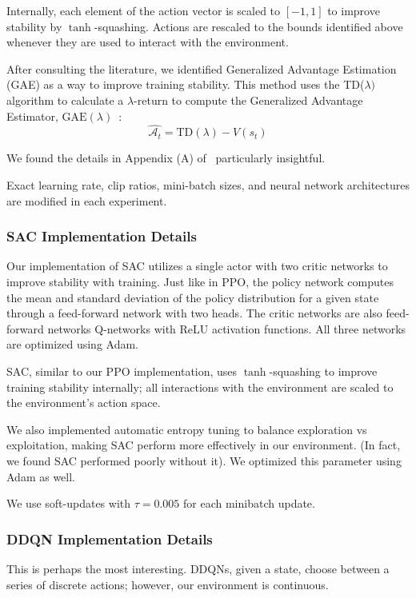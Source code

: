 \documentclass[12pt]{article}
\begin{document}
Internally, each element of the action vector is scaled to $[-1, 1]$ to improve stability by $\tanh$-squashing. Actions are rescaled to the bounds identified above whenever they are used to interact with the environment. 

After consulting the literature, we identified Generalized Advantage Estimation (GAE) as a way to improve training stability. This method uses the TD($\lambda)$ algorithm to calculate a $\lambda$-return to compute the Generalized Advantage Estimator, $\mathrm{GAE}(\lambda)$~\cite{schulman2015high}: 
\[\hat{\mathcal{A}_t} = \mathrm{TD}(\lambda) - V(s_t)\]

We found the details in Appendix (A) of~\cite{peng2018deepmimic} particularly insightful. 

Exact learning rate, clip ratios, mini-batch sizes, and neural network architectures are modified in each experiment. 

\subsubsection{SAC Implementation Details}

Our implementation of SAC utilizes a single actor with two critic networks to improve stability with training. Just like in PPO, the policy network computes the mean and standard deviation of the policy distribution for a given state through a feed-forward network with two heads. The critic networks are also feed-forward networks Q-networks with ReLU activation functions. All three networks are optimized using Adam. 

SAC, similar to our PPO implementation, uses $\tanh$-squashing to improve training stability internally; all interactions with the environment are scaled to the environment's action space. 

We also implemented automatic entropy tuning to balance exploration vs exploitation, making SAC perform more effectively in our environment. (In fact, we found SAC performed poorly without it). We optimized this parameter using Adam as well. 

We use soft-updates with $\tau = 0.005$ for each minibatch update. 

\subsubsection{DDQN Implementation Details}

This is perhaps the most interesting. DDQNs, given a state, choose between a series of discrete actions; however, our environment is continuous. 
\end{document}
